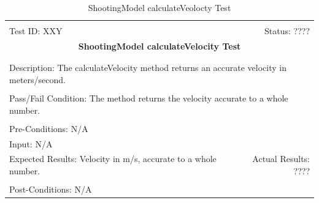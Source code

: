\documentclass[11pt]{article}
\begin{document}
\begin{center}
\begin{table}[H]
\begin{tabular}{|l r|}\hline&\\[-2mm]
	Test ID: XXY	&Status: ????\\[-3mm]
	\multicolumn{2}{|c|}{\textbf{\large{ShootingModel calculateVelocity Test}}}\\&\\\hline&\\[-3mm]
	\multicolumn{2}{|p{\textwidth}|}{Description: The calculateVelocity method returns an accurate velocity in meters/second.}\\[1mm]\hline&\\[-3mm]
	\multicolumn{2}{|p{\textwidth}|}{Pass/Fail Condition: The method returns the velocity accurate to a whole number.}\\[1mm]\hline&\\[-3mm]
	\multicolumn{2}{|p{\textwidth}|}{Pre-Conditions: N/A}\\[4mm]
	\multicolumn{2}{|p{\textwidth}|}{Input: N/A}\\[2mm]\hline
	\multicolumn{1}{|p{0.49\textwidth}}{Expected Results: Velocity in m/s, accurate to a whole number.}	&\multicolumn{1}{|p{0.45\textwidth}|}{Actual Results: ????}\\\hline&\\[-3mm]
	\multicolumn{2}{|p{\textwidth}|}{Post-Conditions: N/A}\\\hline
\end{tabular}
\caption{ShootingModel calculateVeolocty Test}
\end{table}
\end{center}
\end{document}
